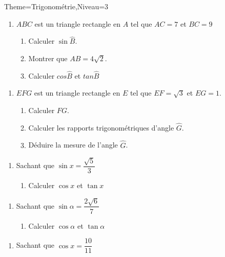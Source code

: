 \documentclass[a4paper,12pt]{article}
\begin{document}
\begin{Maquette}[Fiche]{Theme=Trigonométrie,Niveau=3}

\begin{exercice}
\begin{minipage}{.5\linewidth}
\begin{enumerate}
\item $ABC$ est un triangle rectangle en $A$ tel que $AC=7$ et $BC=9$
\begin{enumerate}
\item Calculer $\sin\widehat{B}$.
\item Montrer que $AB=4\sqrt{2}$.
\item Calculer $cos\widehat{B}$ et $tan\widehat{B}$
\end{enumerate}
\end{enumerate}
\begin{enumerate}[start=2]
\item $EFG$ est un triangle rectangle en $E$ tel que $EF=\sqrt{3}$ et $EG=1$.
\begin{enumerate}
\item Calculer $FG$.
\item Calculer les rapports trigonométriques d'angle $\widehat{G}$.
\item Déduire la mesure de l'angle $\widehat{G}$.
\end{enumerate}
\end{enumerate}
\end{minipage}\hspace{0.1\linewidth}
\begin{minipage}{.4\linewidth}
\begin{enumerate}[start=3]
\item Sachant que $\sin x=\dfrac{\sqrt{5}}{3}$
\begin{enumerate}
\item Calculer $\cos x$ et $\tan x$
\end{enumerate} 
\end{enumerate}
\begin{enumerate}[start=4]
\item Sachant que $\sin\alpha=\dfrac{2\sqrt{6}}{7}$
\begin{enumerate}
\item Calculer $\cos\alpha$ et $\tan\alpha$
\end{enumerate}
\end{enumerate}
\begin{enumerate}[start=5]
\item Sachant que $\cos x=\dfrac{10}{11}$

\end{enumerate}
\end{minipage}
\end{exercice}
\end{Maquette}
\end{document}
